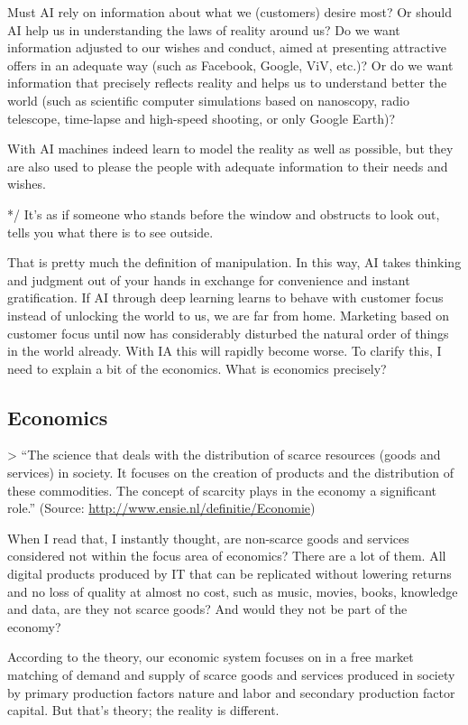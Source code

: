 \documentclass[11pt]{article}
\begin{document}
Must AI rely on information about what we (customers) desire most? Or should AI help us in understanding the laws of reality around us? Do we want information adjusted to our wishes and conduct, aimed at presenting attractive offers in an adequate way (such as Facebook, Google, ViV, etc.)? Or do we want information that precisely reflects reality and helps us to understand better the world (such as scientific computer simulations based on nanoscopy, radio telescope, time-lapse and high-speed shooting, or only Google Earth)?

With AI machines indeed learn to model the reality as well as possible, but they are also used to please the people with adequate information to their needs and wishes.

*/ It’s as if someone who stands before the window and obstructs to look out, tells you what there is to see outside.

That is pretty much the definition of manipulation. In this way, AI takes thinking and judgment out of your hands in exchange for convenience and instant gratification. If AI through deep learning learns to behave with customer focus instead of unlocking the world to us, we are far from home. Marketing based on customer focus until now has considerably disturbed the natural order of things in the world already. With IA this will rapidly become worse. To clarify this, I need to explain a bit of the economics. What is economics precisely?

\subsection{Economics}
\label{sec:org01841e1}

> “The science that deals with the distribution of scarce resources (goods and services) in society. It focuses on the creation of products and the distribution of these commodities. The concept of scarcity plays in the economy a significant role.” 
(Source: \url{http://www.ensie.nl/definitie/Economie}) 

When I read that, I instantly thought, are non-scarce goods and services considered not within the focus area of economics? There are a lot of them. All digital products produced by IT that can be replicated without lowering returns and no loss of quality at almost no cost, such as music, movies, books, knowledge and data, are they not scarce goods? And would they not be part of the economy?

According to the theory, our economic system focuses on in a free market matching of demand and supply of scarce goods and services produced in society by primary production factors nature and labor and secondary production factor capital. But that’s theory; the reality is different.
\end{document}
